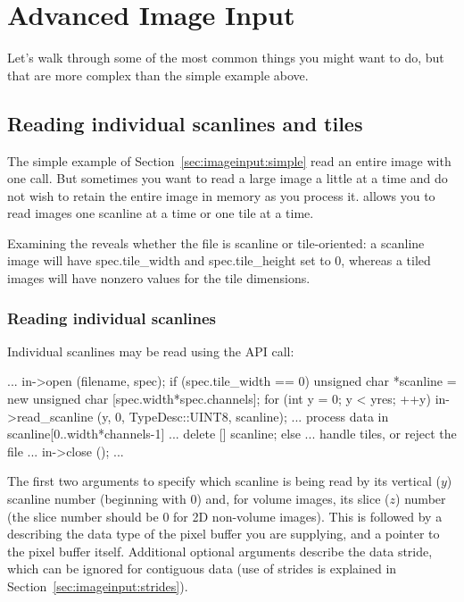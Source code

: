 \section{Advanced Image Input}
\label{sec:advancedimageinput}

Let's walk through some of the most common things you might want to do,
but that are more complex than the simple example above.


\subsection{Reading individual scanlines and tiles}
\label{sec:imageinput:scanlinestiles}

The simple example of Section~\ref{sec:imageinput:simple} read an
entire image with one call.  But sometimes you want to read a large
image a
little at a time and do not wish to retain the entire image in memory
as you process it.  \product allows you to read images
one scanline at a time or one tile at a time.

Examining the \ImageSpec reveals whether the file is scanline or
tile-oriented: a scanline image will have {\cf spec.tile_width} 
and {\cf spec.tile_height} set to 0, whereas a tiled images will
have nonzero values for the tile dimensions.


\subsubsection{Reading individual scanlines}

Individual scanlines may be read using the \readscanline API
call:

\begin{code}
        ...
        in->open (filename, spec);
        if (spec.tile_width == 0) {
            unsigned char *scanline = new unsigned char [spec.width*spec.channels];
            for (int y = 0;  y < yres;  ++y) {
                in->read_scanline (y, 0, TypeDesc::UINT8, scanline);
                ... process data in scanline[0..width*channels-1] ...
            }
            delete [] scanline;
        } else {
            ... handle tiles, or reject the file ...
        }
        in->close ();
        ...
\end{code}

The first two arguments to \readscanline specify which scanline
is being read by its vertical ($y$) scanline number (beginning with 0)
and, for volume images, its slice ($z$) number (the slice number should
be 0 for 2D non-volume images).  This is followed by a \TypeDesc
describing the data type of the pixel buffer you are supplying, and a
pointer to the pixel buffer itself.  Additional optional arguments
describe the data stride, which can be ignored for contiguous data (use
of strides is explained in Section~\ref{sec:imageinput:strides}).

